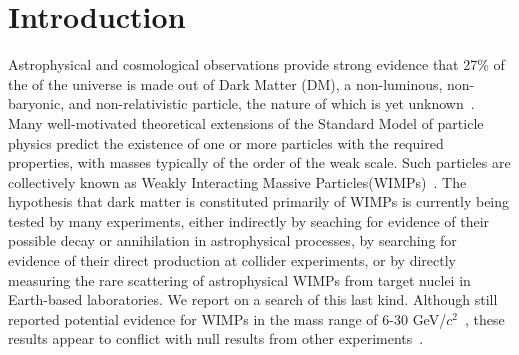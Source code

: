 \section{Introduction}

Astrophysical and cosmological observations provide strong evidence that 27\% of the  of the universe is made out of Dark Matter (DM), a non-luminous, non-baryonic, and non-relativistic particle, the nature of which is yet unknown~\cite{Harvey1462,WMAP:9years,PLANCK}. Many well-motivated theoretical extensions of the Standard Model of particle physics predict the existence of one or more particles with the required properties, with masses  typically of the order of the weak scale. Such particles are collectively known as Weakly Interacting Massive Particles(WIMPs)~\cite{Bertone:2010zza}. The hypothesis that dark matter is constituted primarily of WIMPs is currently being tested by many experiments, either indirectly by seaching for evidence of their possible decay or annihilation in astrophysical processes, by searching for evidence of their direct production at collider experiments, or by directly measuring the rare scattering of astrophysical WIMPs from target nuclei in Earth-based laboratories. We report on a search of this last kind. Although  still reported potential evidence for WIMPs in the mass range of 6-30 GeV/$c^2$~\cite{DAMA,}, these results appear to conflict with null results from other experiments~\cite{xe100_run_combination,PANDAX,LUXnew,COGENT,CDMSlite,CREST}.

